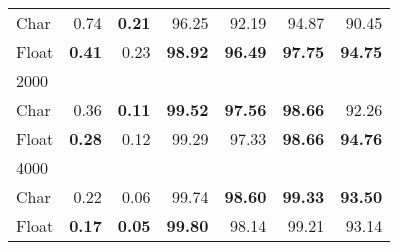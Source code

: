 \begin{table}
\begin{subtable}[h]{0.495\linewidth}
{\begin{tabular}{lrrrrrr}
\cline{1-1}
Char & 0.74 & \textbf{0.21} & 96.25 & 92.19 & 94.87 & 90.45 \\
Float & \textbf{0.41} & 0.23 & \textbf{98.92} & \textbf{96.49} & \textbf{97.75} & \textbf{94.75} \\
\hline
2000 \\
\cline{1-1}
Char & 0.36 & \textbf{0.11} & \textbf{99.52} & \textbf{97.56} & \textbf{98.66} & 92.26 \\
Float & \textbf{0.28} & 0.12 & 99.29 & 97.33 & \textbf{98.66} & \textbf{94.76} \\
\hline
4000 \\
\cline{1-1}
Char & 0.22 & 0.06 & 99.74 & \textbf{98.60} & \textbf{99.33} & \textbf{93.50} \\
Float & \textbf{0.17} & \textbf{0.05} & \textbf{99.80} & 98.14 & 99.21 & 93.14 \\
\bottomrule
\end{tabular}
}
\label{table:clevr_ood_efficiency}
\end{subtable}
\label{table:clevr_data_efficiency}
\end{table}
